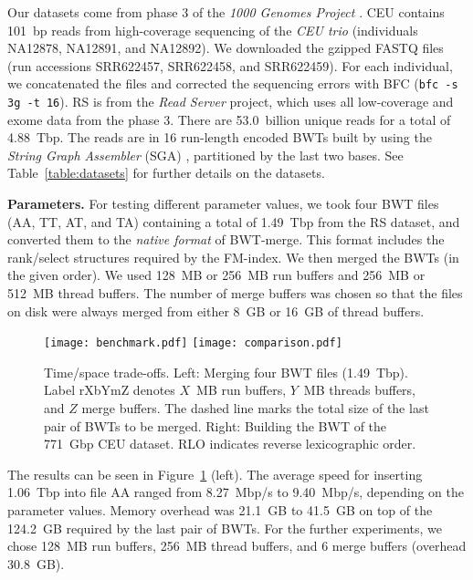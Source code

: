 \documentclass[smallabstract,smallcaptions]{dccpaper}
\newcommand{\BWT}{\textsf{BWT}}
\newcommand{\rank}{\textsf{rank}}
\newcommand{\select}{\textsf{select}}
\newcommand{\BWTmerge}{\textsf{BWT\nobreakdash-merge}}
\newcommand{\CEU}{\textsf{CEU}}
\newcommand{\RS}{\textsf{RS}}
\begin{document}
Our datasets come from phase 3 of the \emph{1000 Genomes Project} \cite{1000GP2015}. \CEU{} contains 101~bp reads from high-coverage sequencing of the \emph{CEU trio} (individuals NA12878, NA12891, and NA12892). We downloaded the gzipped FASTQ files (run accessions SRR622457, SRR622458, and SRR622459). For each individual, we concatenated the files and corrected the sequencing errors with BFC \cite{Li2015} (\texttt{bfc -s 3g -t 16}). \RS{} is from the \emph{Read Server} project, which uses all low-coverage and exome data from the phase 3. There are 53.0~billion unique reads for a total of 4.88~Tbp. The reads are in 16 run-length encoded \BWT{}s built by using the \emph{String Graph Assembler} (SGA) \cite{Simpson2012}, partitioned by the last two bases. See Table~\ref{table:datasets} for further details on the datasets.

\smallbreak\noindent\textbf{Parameters.} For testing different parameter values, we took four \BWT{} files (AA, TT, AT, and TA) containing a total of 1.49~Tbp from the \RS{} dataset, and converted them to the \emph{native format} of \BWTmerge. This format includes the \rank/\select{} structures required by the FM-index. We then merged the \BWT{}s (in the given order). We used 128~MB or 256~MB run buffers and 256~MB or 512~MB thread buffers. The number of merge buffers was chosen so that the files on disk were always merged from either 8~GB or 16~GB of thread buffers.

\begin{figure}[t!]
\begin{center}
\texttt{[image: benchmark.pdf]}%
\hspace{-0.3in}%
\texttt{[image: comparison.pdf]}
\end{center}%
\vspace{-12pt}
\caption{Time/space trade-offs. Left: Merging four \BWT{} files (1.49~Tbp). Label rXbYmZ denotes $X$~MB run buffers, $Y$~MB threads buffers, and $Z$ merge buffers. The dashed line marks the total size of the last pair of \BWT{}s to be merged. Right: Building the \BWT{} of the 771~Gbp \CEU{} dataset. RLO indicates reverse lexicographic order.}\label{fig:benchmark}%
\vspace{-6pt}
\end{figure}

The results can be seen in Figure~\ref{fig:benchmark} (left). The average speed for inserting 1.06~Tbp into file AA ranged from 8.27~Mbp/s to 9.40~Mbp/s, depending on the parameter values. Memory overhead was 21.1~GB to 41.5~GB on top of the 124.2~GB required by the last pair of \BWT{}s.
%
For the further experiments, we chose 128~MB run buffers, 256~MB thread buffers, and 6 merge buffers (overhead 30.8~GB).
\end{document}
